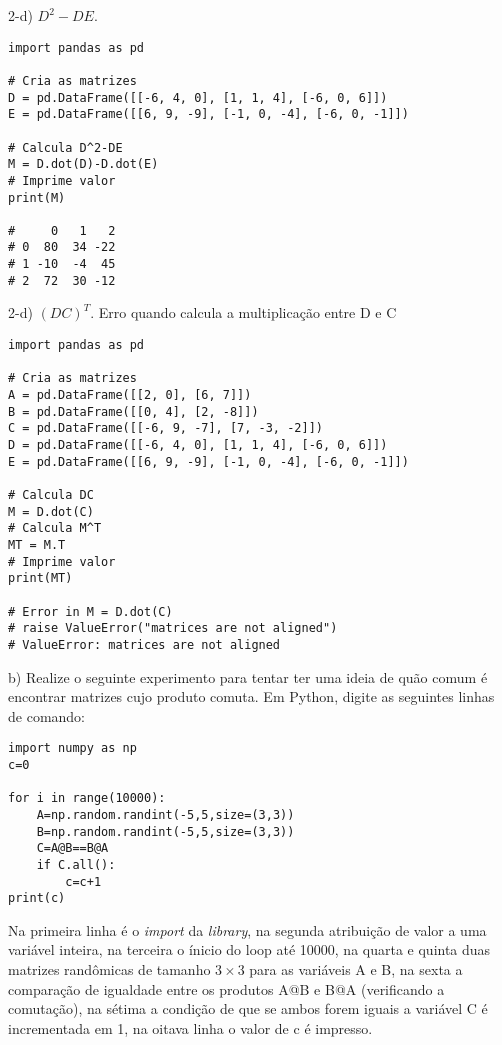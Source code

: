 2-d) $D^2-DE$.
\\

\begin{lstlisting}
import pandas as pd

# Cria as matrizes
D = pd.DataFrame([[-6, 4, 0], [1, 1, 4], [-6, 0, 6]])
E = pd.DataFrame([[6, 9, -9], [-1, 0, -4], [-6, 0, -1]])
    
# Calcula D^2-DE
M = D.dot(D)-D.dot(E)
# Imprime valor
print(M)
    
#     0   1   2
# 0  80  34 -22
# 1 -10  -4  45
# 2  72  30 -12
\end{lstlisting}


2-d) $(DC)^T$. Erro quando calcula a multiplicação entre D e C
\\

\begin{lstlisting}
import pandas as pd

# Cria as matrizes
A = pd.DataFrame([[2, 0], [6, 7]])
B = pd.DataFrame([[0, 4], [2, -8]])
C = pd.DataFrame([[-6, 9, -7], [7, -3, -2]])
D = pd.DataFrame([[-6, 4, 0], [1, 1, 4], [-6, 0, 6]])
E = pd.DataFrame([[6, 9, -9], [-1, 0, -4], [-6, 0, -1]])

# Calcula DC
M = D.dot(C)
# Calcula M^T
MT = M.T
# Imprime valor
print(MT)

# Error in M = D.dot(C)
# raise ValueError("matrices are not aligned")
# ValueError: matrices are not aligned
\end{lstlisting}


b) Realize o seguinte experimento para tentar ter uma ideia de quão comum é encontrar matrizes cujo produto comuta. Em Python, digite as seguintes linhas de comando:
\\

\begin{lstlisting}
import numpy as np
c=0

for i in range(10000):
    A=np.random.randint(-5,5,size=(3,3))
    B=np.random.randint(-5,5,size=(3,3))
    C=A@B==B@A
    if C.all():
        c=c+1
print(c)    
\end{lstlisting}


Na primeira linha é o \textit{import} da \textit{library}, na segunda atribuição de valor a uma variável inteira, na terceira o ínicio do loop até 10000, na quarta e quinta duas matrizes randômicas de tamanho $3\times 3$ para as variáveis A e B, na sexta a comparação de igualdade entre os produtos A@B e B@A (verificando a comutação), na sétima a condição de que se ambos forem iguais a variável C é incrementada em 1, na oitava linha o valor de c é impresso.
\\

